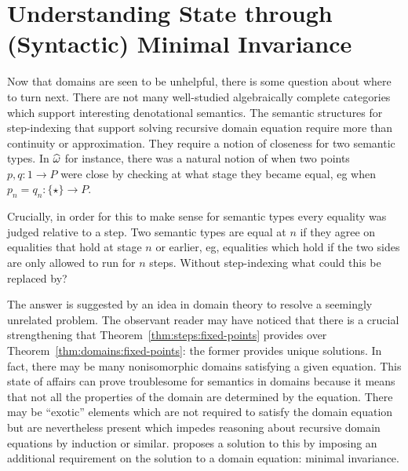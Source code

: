 \section{Understanding State through (Syntactic) Minimal Invariance}\label{sec:smi}

Now that domains are seen to be unhelpful, there is some question
about where to turn next. There are not many well-studied
algebraically complete categories~\citep{Freyd:70} which support
interesting denotational semantics. The semantic structures for
step-indexing that support solving recursive domain equation require
more than continuity or approximation. They require a notion of
closeness for two semantic types. In $\widehat{\omega}$ for
instance, there was a natural notion of when two points
$p, q : 1 \to P$ were close by checking at what stage they became
equal, eg when $p_n = q_n : \{\star\} \to P$.

Crucially, in order for this to make sense for semantic types every
equality was judged relative to a step. Two semantic types are equal
at $n$ if they agree on equalities that hold at stage $n$ or earlier,
eg, equalities which hold if the two sides are only allowed to run for
$n$ steps. Without step-indexing what could this be replaced by?

The answer is suggested by an idea in domain theory to resolve a
seemingly unrelated problem. The observant reader may have noticed
that there is a crucial strengthening that
Theorem~\ref{thm:steps:fixed-points} provides over
Theorem~\ref{thm:domains:fixed-points}: the former provides unique
solutions. In fact, there may be many nonisomorphic domains satisfying
a given equation. This state of affairs can prove troublesome for
semantics in domains because it means that not all the properties of
the domain are determined by the equation. There may be ``exotic''
elements which are not required to satisfy the domain equation but are
nevertheless present which impedes reasoning about recursive domain
equations by induction or similar. \citet{Pitts:96} proposes a
solution to this by imposing an additional requirement on the solution
to a domain equation: minimal invariance.

